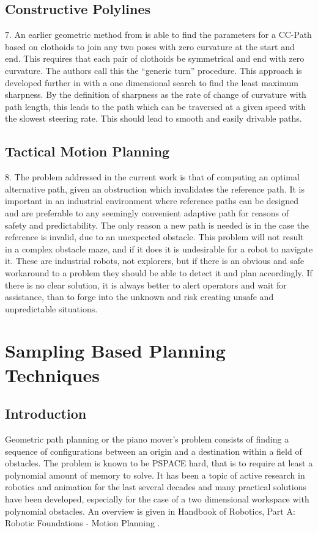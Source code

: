 \subsection{Constructive Polylines}
7. An earlier geometric method from \cite{Henrie2007} is able to find the parameters for a CC-Path based on clothoids to join any two poses with zero curvature at the start and end. This requires that each pair of clothoids be symmetrical and end with zero curvature. The authors call this the ``generic turn'' procedure. This approach is developed further in \cite{Wilde2009} with a one dimensional search to find the least maximum sharpness. By the definition of sharpness as the rate of change of curvature with path length, this leads to the path which can be traversed at a given speed with the slowest steering rate. This should lead to smooth and easily drivable paths.

\subsection{Tactical Motion Planning}
8. The problem addressed in the current work is that of computing an optimal alternative path, given an obstruction which invalidates the reference path. It is important in an industrial environment where reference paths can be designed and are preferable to any seemingly convenient adaptive path for reasons of safety and predictability. The only reason a new path is needed is in the case the reference is invalid, due to an unexpected obstacle. This problem will not result in a complex obstacle maze, and if it does it is undesirable for a robot to navigate it. These are industrial robots, not explorers, but if there is an obvious and safe workaround to a problem they should be able to detect it and plan accordingly. If there is no clear solution, it is always better to alert operators and wait for assistance, than to forge into the unknown and risk creating unsafe and unpredictable situations.  

\section{Sampling Based Planning Techniques}
\label{sec:sampling_based}
\subsection{Introduction}
Geometric path planning or the piano mover's problem consists of finding a sequence of configurations between an origin and a destination within a field of obstacles. The problem is known to be PSPACE hard, that is to require at least a polynomial amount of memory to solve. It has been a topic of active research in robotics and animation for the last several decades and many practical  solutions have been developed, especially for the case of a two dimensional workspace with polynomial obstacles. An overview is given in Handbook of Robotics, Part A: Robotic Foundations - Motion Planning \cite{SicilianoKhatib2016}. 

